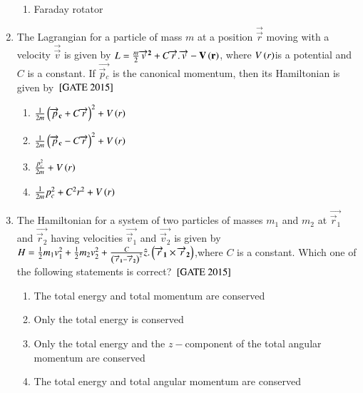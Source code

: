 \documentclass[journal]{IEEEtran}
\begin{document}
\begin{enumerate}
\begin{multicols}{2}
\begin{enumerate}
    \item Faraday rotator
\end{enumerate}
\end{multicols}
\item The Lagrangian for a particle of mass $m$ at a position $\vec{\overrightarrow{r}}$ moving with a velocity $\vec{\overrightarrow{v}}$ is given by $L = \frac{m}{2}\mathbf{\overrightarrow{v}^2} + C\mathbf{\overrightarrow{r}.\mathbf{\overrightarrow{v} - V\left(r\right)}}$, where $V\left(r\right)$is a potential and $C$ is a constant. If $\vec{\overrightarrow{p}{_c}}$ is the canonical momentum, then its Hamiltonian is given by \hfill{${}\left[\text{GATE 2015}\right]$} 
\begin{multicols}{2}
\begin{enumerate}
    \item $\frac{1}{2m}\left(\mathbf{\overrightarrow{p}_c} + C\mathbf{\overrightarrow{r}}\right)^2 + V\left(r\right)$
    \item $\frac{1}{2m}\left(\mathbf{\overrightarrow{p}_c} - C\mathbf{\overrightarrow{r}}\right)^2 + V\left(r\right)$
    \item $\frac{p_c^2}{2m} + V\left(r\right)$
    \item $\frac{1}{2m}p_c^2 + C^2r^2 + V\left(r\right)$
\end{enumerate}
\end{multicols}
\item The Hamiltonian for a system of two particles of masses $m_1$ and $m_2$ at $\vec{\overrightarrow{r}{_1}}$ and $\vec{\overrightarrow{r}{_2}}$ having velocities $\vec{\overrightarrow{v}{_1}}$ and $\vec{\overrightarrow{v}{_2}}$ is given by $H = \frac{1}{2}m_1v_1^2 + \frac{1}{2}m_2v_2^2 + \frac{C}{\left(\mathbf{\overrightarrow{r}{_1} - \mathbf{\overrightarrow{r}{_2}}}\right)^2}\hat{z}.\left(\mathbf{\overrightarrow{r}{_1}}\times\mathbf{\overrightarrow{r}{_2}}\right)$,where $C$ is a constant. Which one of the following statements is correct? \hfill{${}\left[\text{GATE 2015}\right]$} 
\begin{enumerate}
    \item The total energy and total momentum are conserved 
    \item Only the total energy is conserved
    \item Only the total energy and the $z-$component of the total angular momentum are conserved 
    \item The total energy and total angular momentum are conserved
\end{enumerate}

\end{enumerate}

 
\end{document}
